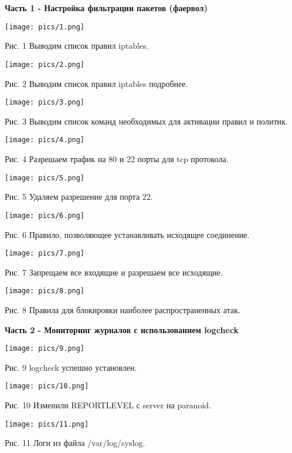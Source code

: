 \documentclass[a4paper,14pt]{extarticle}
\begin{document}
    \textbf{Часть 1 - Настройка фильтрации пакетов (фаервол)}
    \begin{center}

        \texttt{[image: pics/1.png]}

        Рис. 1 Выводим список правил iptables.
        \vspace{1ex}

        \texttt{[image: pics/2.png]}

        Рис. 2 Выводим список правил iptables подробнее.
        \vspace{1ex}

        \texttt{[image: pics/3.png]}

        Рис. 3 Выводим список команд необходимых для активации правил и политик.
        \vspace{1ex}

        \texttt{[image: pics/4.png]}

        Рис. 4 Разрешаем трафик на 80 и 22 порты для tcp протокола.
        \vspace{1ex}

        \texttt{[image: pics/5.png]}

        Рис. 5 Удаляем разрешение для порта 22.
        \vspace{1ex}

        \texttt{[image: pics/6.png]}

        Рис. 6 Правило, позволяющее устанавливать исходящее соединение.  
        \vspace{1ex}

        \texttt{[image: pics/7.png]}
        
        Рис. 7 Запрещаем все входящие и разрешаем все исходящие.
        \vspace{1ex}

        \texttt{[image: pics/8.png]}

        Рис. 8  Правила для блокировки наиболее распространенных атак.
        \vspace{1ex}
    \end{center}

    \newpage
    \textbf{Часть 2 - Мониторинг журналов с использованием logcheck}
    \begin{center}

        \texttt{[image: pics/9.png]}

        Рис. 9 logcheck успешно установлен. 
        \vspace{1ex}

        \texttt{[image: pics/10.png]}

        Рис. 10 Изменили REPORTLEVEL с server на paranoid.
        \vspace{1ex}

        \texttt{[image: pics/11.png]}

        Рис. 11  Логи из файла /var/log/syslog.
        \vspace{1ex}

   \end{center}
\end{document}
